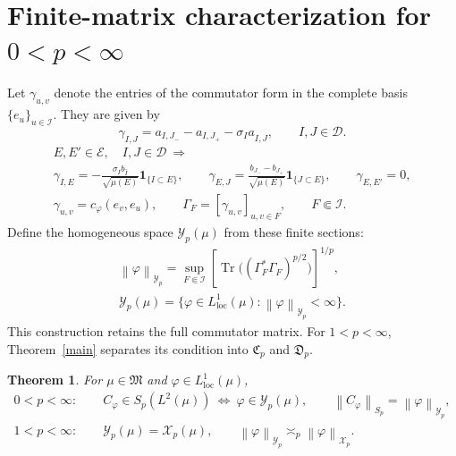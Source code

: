 \documentclass[11pt]{amsart}
\newtheorem{theorem}{Theorem}
\newcommand{\D}{\mathcal D}
\newcommand{\X}{\mathcal X}
\newcommand{\Y}{\mathcal Y}
\newcommand{\tr}{\operatorname{Tr}}
\newcommand{\norm}[1]{\left\|#1\right\|}
\newcommand{\fin}{\Subset}
\begin{document}
\section{Finite-matrix characterization for \texorpdfstring{$0<p<\infty$}{0 < p < infinity}}
Let $\gamma_{u,v}$ denote the entries of the commutator form in the
complete basis $\{e_u\}_{u\in\mathcal I}$. They are given by
\begin{equation}\label{gamma}
 \gamma_{I,J}=a_{I,J_-}-a_{I,J_+}-\sigma_Ia_{\widehat I,J},
                      \qquad I,J\in\D.
\end{equation}
\begin{gather*}
 E,E'\in\mathscr E,\quad I,J\in\D
 \ \Longrightarrow\\
 \gamma_{I,E}=-\frac{\sigma_Ib_{\widehat I}}{\sqrt{\mu(E)}}
                       \mathbf1_{\{I\subset E\}},\qquad
 \gamma_{E,J}=\frac{b_{J_-}-b_{J_+}}{\sqrt{\mu(E)}}
                       \mathbf1_{\{J\subset E\}},\qquad
 \gamma_{E,E'}=0,\\
 \gamma_{u,v}=c_\varphi(e_v,e_u),\qquad
 \Gamma_F=[\gamma_{u,v}]_{u,v\in F},\qquad F\fin\mathcal I.
\end{gather*}
Define the homogeneous space $\Y_p(\mu)$ from these finite sections:
\begin{equation}\label{Y-norm}
 \begin{gathered}
 \norm{\varphi}_{\Y_p}
  =\sup_{F\fin\mathcal I}
       \left[\tr\big((\Gamma_F^*\Gamma_F)^{p/2}\big)\right]^{1/p},\\
 \Y_p(\mu)=\{\varphi\in L^1_{\mathrm{loc}}(\mu):
                                      \norm{\varphi}_{\Y_p}<\infty\}.
 \end{gathered}
\end{equation}
This construction retains the full commutator matrix. For
$1<p<\infty$, Theorem~\ref{main} separates its condition into
$\mathfrak C_p$ and $\mathfrak D_p$.
\begin{theorem}\label{all-p}
For $\mu\in\mathfrak M$ and $\varphi\in L^1_{\mathrm{loc}}(\mu)$,
\begin{gather*}
 0<p<\infty:\qquad
 C_\varphi\in S_p(L^2(\mu))\ \Longleftrightarrow\ \varphi\in\Y_p(\mu),
 \qquad\norm{C_\varphi}_{S_p}=\norm{\varphi}_{\Y_p},\\
 1<p<\infty:\qquad
 \Y_p(\mu)=\X_p(\mu),\qquad
 \norm{\varphi}_{\Y_p}\asymp_p\norm{\varphi}_{\X_p}.
\end{gather*}
\end{theorem}
\end{document}
